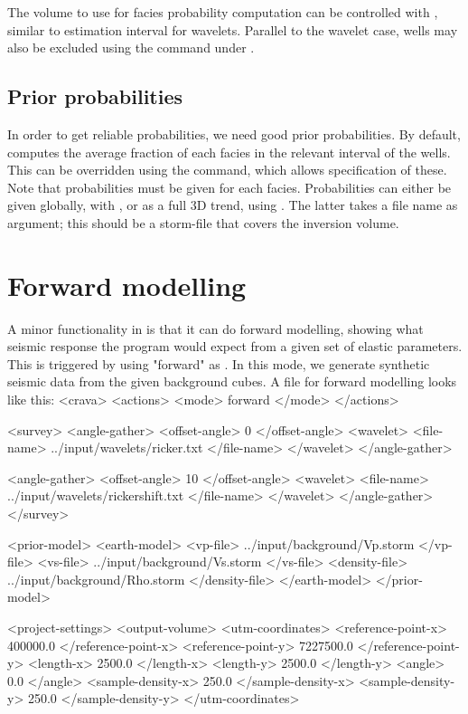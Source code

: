 {The volume to use for facies probability computation can be controlled
with , similar to estimation interval
for wavelets. Parallel to the wavelet case, wells may also be excluded
using the  command under . 

\subsection{Prior probabilities}
In order to get reliable probabilities, we need good prior
probabilities. By default, \crava computes the average fraction of
each facies in the relevant interval of the wells. This can be
overridden using the  command, which
allows specification of these. Note that probabilities must be given
for each facies. Probabilities can either be given globally, with
, or as a full 3D trend, using
. The latter takes a file name as argument; this
should be a storm-file that covers the inversion volume. 

\section{Forward modelling}
\label{sec:forwardusr}
A minor functionality in \crava is that it can do forward modelling,
showing what seismic response the program would expect from a given
set of elastic parameters. This is triggered by using "forward" as
. In this mode, we generate synthetic seismic data from the
given background cubes. A file for forward modelling looks like this: 
<crava>
<actions>
  <mode> forward </mode>
</actions>

<survey>
  <angle-gather>
    <offset-angle>  0 </offset-angle>
    <wavelet>
      <file-name> ../input/wavelets/ricker.txt      </file-name>
    </wavelet>
  </angle-gather>

  <angle-gather>
    <offset-angle> 10 </offset-angle>
    <wavelet>
      <file-name> ../input/wavelets/rickershift.txt </file-name>
    </wavelet>
  </angle-gather>
</survey>

<prior-model>
  <earth-model>
    <vp-file>      ../input/background/Vp.storm  </vp-file>
    <vs-file>      ../input/background/Vs.storm  </vs-file>
    <density-file> ../input/background/Rho.storm </density-file>
  </earth-model>
</prior-model>

<project-settings>
  <output-volume>
    <utm-coordinates>
      <reference-point-x>  400000.0 </reference-point-x>
      <reference-point-y> 7227500.0 </reference-point-y>
      <length-x>             2500.0 </length-x>
      <length-y>             2500.0 </length-y>
      <angle>                   0.0 </angle>
      <sample-density-x>      250.0 </sample-density-x>
      <sample-density-y>      250.0 </sample-density-y>
    </utm-coordinates>

}
